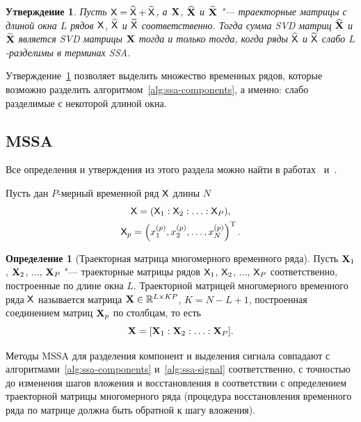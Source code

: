\documentclass[specialist,
    substylefile = spbu.rtx,
    subf,href,colorlinks=true, 12pt]{disser}
\theoremstyle{plain}
\newtheorem{statement}{Утверждение}[section]
\theoremstyle{definition}
\newtheorem{definition}{Определение}[section]
\theoremstyle{remark}
\begin{document}
    \begin{statement}
        \label{state:ssa-separability}
        Пусть $\mathsf{X} = \widehat{\mathsf{X}} + \widetilde{\mathsf{X}}$, а $\mathbf{X}$, $\widehat{\mathbf{X}}$ и $\widetilde{\mathbf{X}}$ "--- траекторные
        матрицы с длиной окна $L$ рядов $\mathsf{X}$, $\widehat{\mathsf{X}}$ и $\widetilde{\mathsf{X}}$ соответственно.
        Тогда сумма \emph{SVD} матриц $\widehat{\mathbf{X}}$ и $\widetilde{\mathbf{X}}$ является \emph{SVD} матрицы $\mathbf{X}$ тогда и только тогда, когда
        ряды $\widehat{\mathsf{X}}$ и $\widetilde{\mathsf{X}}$ слабо $L$-разделимы в терминах \emph{SSA}.
    \end{statement}

    Утверждение~\ref{state:ssa-separability} позволяет выделить множество временных рядов, которые возможно
    разделить алгоритмом~\ref{alg:ssa-components}, а именно: слабо разделимые с некоторой длиной окна.


    \subsection{MSSA}\label{subsec:mssa}
    Все определения и утверждения из этого раздела можно найти в работах~\cite{ssa-2020} и~\cite{mssa}.

    Пусть дан $P$-мерный временной ряд $\mathsf{X}$ длины $N$
    \begin{gather*}
        \mathsf{X} = (\mathsf{X}_1: \mathsf{X}_2: \ldots: \mathsf{X}_P), \\
        \mathsf{X}_p = \left(x_1^{(p)}, x_2^{(p)}, \ldots, x_N^{(p)}\right)^{\mathrm{T}}.
    \end{gather*}

    \begin{definition}[Траекторная матрица многомерного временного ряда]
        Пусть \linebreak $\mathbf{X}_1$, $\mathbf{X}_2$, $\ldots$, $\mathbf{X}_P$ "--- траекторные матрицы рядов
        $\mathsf{X}_1$, $\mathsf{X}_2$, $\ldots$, $\mathsf{X}_P$ соответственно, построенные по длине окна $L$.
        Траекторной матрицей многомерного временного ряда $\mathsf{X}$ называется
        матрица $\mathbf{X}\in \mathbb{R}^{L \times KP}$, $K = N - L + 1$, построенная соединением матриц $\mathbf{X}_p$ по столбцам, то есть
        \[
            \mathbf{X} = [\mathbf{X}_1 : \mathbf{X}_2 : \ldots : \mathbf{X}_P].
        \]
    \end{definition}

    Методы MSSA для разделения компонент и выделения сигнала совпадают с алгоритмами~\ref{alg:ssa-components}
    и~\ref{alg:ssa-signal} соответственно, с точностью до изменения шагов вложения и восстановления в соответствии
    с определением траекторной матрицы многомерного ряда (процедура восстановления временного ряда по
    матрице должна быть обратной к шагу вложения).
\end{document}

